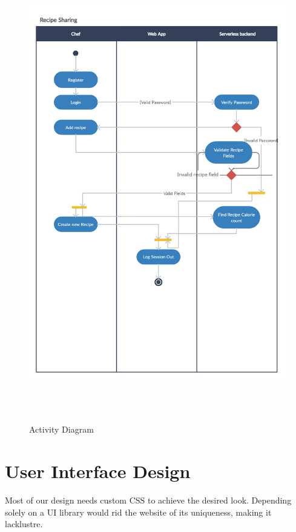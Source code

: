 \begin{figure}[!hb]
\centering
\caption[Activity Diagram]{Activity Diagram}%
\label{fig:activity_diagram}
\includegraphics[width=\linewidth,height=20cm,keepaspectratio]{img/activity_diagram}
\end{figure}

\section{User Interface Design}

Most of our design needs custom CSS to achieve the desired look. Depending solely on a UI library would rid the website of its uniqueness, making it lacklustre. 

